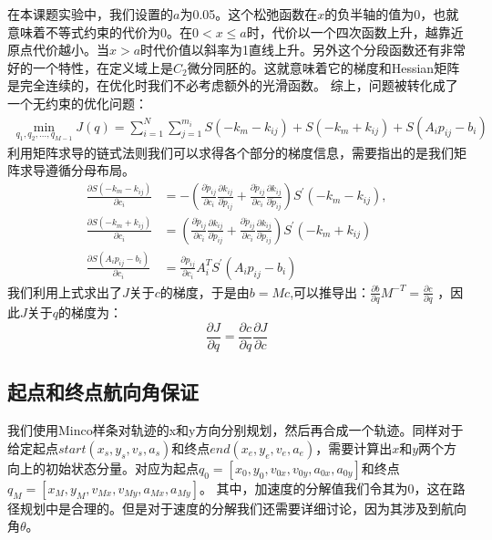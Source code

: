 \documentclass[master,academic]{ysuthesis} %
\begin{document}
		在本课题实验中，我们设置的$a$为0.05。这个松弛函数在$x$的负半轴的值为0，也就意味着不等式约束的代价为0。在$0<x \le a$时，代价以一个四次函数上升，越靠近原点代价越小。当$x>a$时代价值以斜率为1直线上升。另外这个分段函数还有非常好的一个特性，在定义域上是$C_2$微分同胚的。这就意味着它的梯度和Hessian矩阵是完全连续的，在优化时我们不必考虑额外的光滑函数。
		综上，问题被转化成了一个无约束的优化问题：
		\begin{equation}
			\begin{aligned}
				\min_{q_1,q_2,...,q_{M-1}}  J( q ) = \sum_{i=1}^N{\sum_{j=1}^{m_i}{S( -k_m-k_{ij} ) +S( -k_m+k_{ij} ) +S( A_ip_{ij}-b_i )}}
			\end{aligned}
			\label{eq:单阶无约束优化代价}
		\end{equation}
		利用矩阵求导的链式法则我们可以求得各个部分的梯度信息，需要指出的是我们矩阵求导遵循分母布局。
		\begin{equation}
			\begin{aligned}
				\frac{\partial S( -k_m-k_{ij} )}{\partial c_i}&=-( \frac{\partial \dot{p}_{ij}}{\partial c_i}\frac{\partial k_{ij}}{\partial \dot{p}_{ij}}+\frac{\partial \ddot{p}_{ij}}{\partial c_i}\frac{\partial k_{ij}}{\partial \ddot{p}_{ij}} ) S^{'} ( -k_m-k_{ij} ) ,\\
				\frac{\partial S( -k_m+k_{ij} )}{\partial c_i}&=( \frac{\partial \dot{p}_{ij}}{\partial c_i}\frac{\partial k_{ij}}{\partial \dot{p}_{ij}}+\frac{\partial \ddot{p}_{ij}}{\partial c_i}\frac{\partial k_{ij}}{\partial \ddot{p}_{ij}} ) S^{'} ( -k_m+k_{ij} ) \\
				\frac{\partial S( A_ip_{ij}-b_i )}{\partial c_i}&=\frac{\partial p_{ij}}{\partial c_i}A_{i}^{T}S^{'}( A_ip_{ij}-b_i ) 
			\end{aligned}
		\end{equation}
		我们利用上式求出了$J$关于$c$的梯度，于是由$b = Mc$,可以推导出：$\frac{\partial b}{\partial q}M^{-T}=\frac{\partial c}{\partial q}$ ，因此$J$关于$q$的梯度为：
		\begin{equation}
			\frac{\partial J}{\partial q}=\frac{\partial c}{\partial q}\frac{\partial J}{\partial c}
		\end{equation}

		\subsection{起点和终点航向角保证}
		我们使用Minco样条对轨迹的x和y方向分别规划，然后再合成一个轨迹。同样对于给定起点$start(x_s,y_s,v_s,a_s)$和终点$end(x_e,y_e,v_e,a_e)$，需要计算出$x$和$y$两个方向上的初始状态分量。对应为起点$q_0=[x_0,y_0,v_{0x},v_{0y},a_{0x},a_{0y}]$和终点$q_M=[x_M,y_M,v_{Mx},v_{My},a_{Mx},a_{My}]$。 其中，加速度的分解值我们令其为0，这在路径规划中是合理的。但是对于速度的分解我们还需要详细讨论，因为其涉及到航向角$\theta$。
\end{document}
